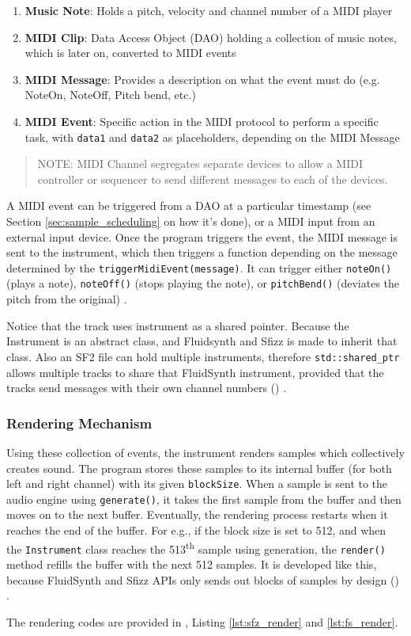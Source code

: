 \begin{enumerate}
    \item \textbf{Music Note}: Holds a pitch, velocity and channel number of a MIDI player
    \item \textbf{MIDI Clip}: Data Access Object (DAO) holding a collection of music notes, which is later on, converted to MIDI events
    \item \textbf{MIDI Message}: Provides a description on what the event must do (e.g. NoteOn, NoteOff, Pitch bend, etc.) \cite{midiassociation2015messages}
    \item \textbf{MIDI Event}: Specific action in the MIDI protocol to perform a specific task, with \texttt{data1} and \texttt{data2}
    as placeholders, depending on the MIDI Message
\end{enumerate}

\begin{quote}
NOTE: MIDI Channel segregates separate devices to allow a MIDI controller or sequencer to send different messages to each
of the devices.
\end{quote}

A MIDI event can be triggered from a DAO at a particular timestamp (see Section \ref{sec:sample_scheduling} on how it's done), 
or a MIDI input from an external input device. Once the program triggers the event, the MIDI message is sent 
to the instrument, which then triggers a function depending on the message determined by the \texttt{triggerMidiEvent(message)}.
It can trigger either \texttt{noteOn()} (plays a note), \texttt{noteOff()} (stops playing the note), or \texttt{pitchBend()} 
(deviates the pitch from the original) \cite{midiassociation2015messages}.

Notice that the track uses instrument as a shared pointer. Because the Instrument is an abstract class, and Fluidsynth and Sfizz is made to
inherit that class. Also an SF2 file can hold multiple instruments, therefore \texttt{std::shared\_ptr} allows multiple tracks to share
that FluidSynth instrument, provided that the tracks send messages with their own channel numbers () \cite{openai_chatgpt}.

\subsubsection{Rendering Mechanism}
Using these collection of events, the instrument renders samples which collectively creates sound. The program stores these samples
to its internal buffer (for both left and right channel) with its given \texttt{blockSize}. When a sample is sent to the audio engine 
using \texttt{generate()}, it takes the first sample from the buffer and then moves on to the next buffer. Eventually, the rendering 
process restarts when it reaches the end of the buffer. For e.g., if the block size is set to 512, and when the \texttt{Instrument} class
reaches the 513\textsuperscript{th} sample using generation, the \texttt{render()} method refills the buffer with the next 512 samples.
It is developed like this, because FluidSynth and Sfizz APIs only sends out blocks of samples by design 
() \cite{openai_chatgpt}.

The rendering codes are provided in , Listing \ref{lst:sfz_render} and \ref{lst:fs_render}.